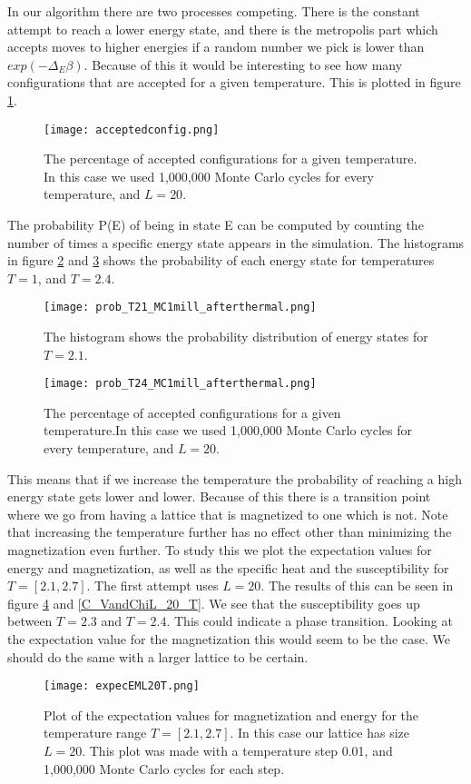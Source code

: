 \documentclass{aa}   %
\begin{document}
In our algorithm there are two processes competing. There is the constant attempt to reach a lower energy state, and there is the metropolis part which accepts moves to higher energies if a random number we pick is lower than $exp(-\Delta_E\beta)$.
Because of this it would be interesting to see how many configurations that are accepted for a given temperature. This is plotted in figure \ref{acceptconfig}.
\begin{figure}
 \texttt{[image: acceptedconfig.png]}
 \caption{The percentage of accepted configurations for a given temperature. In this case we used 1,000,000 Monte Carlo cycles for every temperature, and $L=20$.}
\label{acceptconfig}
\end{figure}
The probability P(E) of being in state E can be computed by counting the number of times a specific energy state appears in the simulation. The histograms in figure \ref{prob1} and \ref{prob2} shows the probability of each energy state for temperatures $T = 1$, and $T = 2.4$.
\begin{figure}
 \texttt{[image: prob\_T21\_MC1mill\_afterthermal.png]}
 \caption{The histogram shows the probability distribution of energy states for $T=2.1$.}
\label{prob1}
\end{figure}
\begin{figure}
 \texttt{[image: prob\_T24\_MC1mill\_afterthermal.png]}
 \caption{The percentage of accepted configurations for a given temperature.In this case we used 1,000,000 Monte Carlo cycles for every temperature, and $L=20$.}
\label{prob2}
\end{figure}
This means that if we increase the temperature the probability of reaching a high energy state gets lower and lower. Because of this there is a transition point where we go from having a lattice that is magnetized to one which is not. Note that increasing the temperature further has no effect other than minimizing the magnetization even further. 
To study this we plot the expectation values for energy and magnetization, as well as the specific heat and the susceptibility for $T=[2.1,2.7]$. The first attempt uses $L=20$. The results of this can be seen in figure \ref{expecEML20T} and \ref{C_VandChiL_20_T}. We see that the susceptibility goes up between $T=2.3$ and $T=2.4$. This could indicate a phase transition. Looking at the expectation value for the magnetization this would seem to be the case. We should do the same with a larger lattice to be certain.
\begin{figure}
 \texttt{[image: expecEML20T.png]}
 \caption{Plot of the expectation values for magnetization and energy for the temperature range $T=[2.1,2.7]$. In this case our lattice has size $L=20$. This plot was made with a temperature step 0.01, and 1,000,000 Monte Carlo cycles for each step.}
\label{expecEML20T}
\end{figure}
\end{document}
